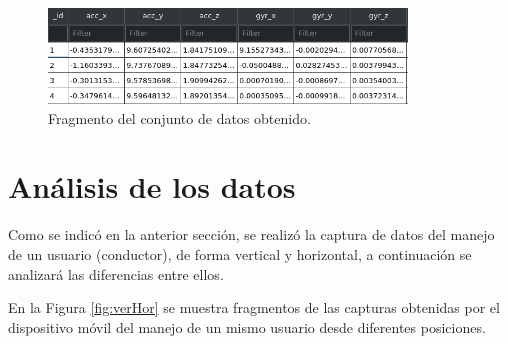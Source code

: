 \begin{figure}[h!]
  \begin{center}	\includegraphics[width=0.85\textwidth]{imagenes/dataset}
  \caption{Fragmento del conjunto de datos obtenido.}
  \label{fig:dataset}
  \end{center}
\end{figure}

\section{An\'{a}lisis de los datos}

Como se indic\'{o} en la anterior secci\'{o}n, se realiz\'{o} la captura de datos del manejo de un usuario (conductor), de forma vertical y horizontal, a continuaci\'{o}n se analizar\'{a} las diferencias entre ellos.

\vspace{5mm} %

En la Figura \ref{fig:verHor} se muestra fragmentos de las capturas obtenidas por el dispositivo m\'{o}vil del manejo de un mismo usuario desde diferentes posiciones.

